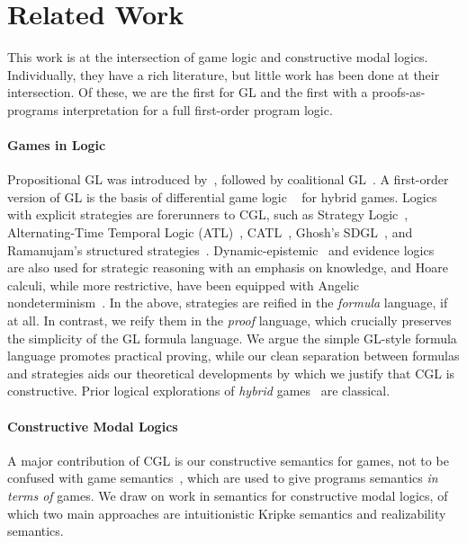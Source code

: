 \documentclass[12pt]{cmuthesis}
\theoremstyle{definition}
\theoremstyle{remark}
\newcommand{\CGL}{\textsf{CGL}\xspace}
\newcommand{\GL}{GL\xspace}
\begin{document}

\section{Related Work}
\newcommand{\semiset}[2]{\{#1~|~#2\}} 
This work is at the intersection of game logic and constructive modal logics.
Individually, they have a rich literature, but little work has been done at their intersection.
Of these, we are the first for \GL and the first with a proofs-as-programs interpretation for a full first-order program logic.

\paragraph{Games in Logic} 
Propositional \GL was introduced by~\cite{DBLP:conf/focs/Parikh83}, followed by coalitional \GL~\cite{DBLP:journals/logcom/Pauly02}.
A first-order version of \GL is the basis of differential game logic \dGL~\cite{DBLP:journals/tocl/Platzer15} for hybrid games.
Logics with explicit strategies are forerunners to \CGL, such as Strategy Logic~\cite{DBLP:conf/concur/ChatterjeeHP07}, Alternating-Time Temporal Logic (ATL)~\cite{DBLP:journals/jacm/AlurHK02}, CATL~\cite{DBLP:conf/atal/HoekJW05}, Ghosh's SDGL~\cite{ghosh2008strategies}, and Ramanujam's structured strategies~\cite{DBLP:conf/kr/RamanujamS08}.
Dynamic-epistemic~\cite{DBLP:series/lncs/Benthem15,DBLP:journals/games/BenthemPR11,van2001games} and evidence logics~\cite{DBLP:journals/sLogica/BenthemP11} are also used for strategic reasoning with an emphasis on knowledge, and Hoare calculi, while more restrictive, have been equipped with Angelic nondeterminism~\cite{DBLP:journals/corr/Mamouras16}.
In the above, strategies are reified in the \emph{formula} language, if at all.
In contrast, we reify them in the \emph{proof} language, which crucially preserves the simplicity of the \GL formula language.
We argue the simple \GL-style formula language promotes practical proving, while our clean separation between formulas and strategies aids our theoretical developments by which we justify that \CGL is constructive.
Prior logical explorations of \emph{hybrid} games~\cite{DBLP:conf/cade/QueselP12,DBLP:journals/tocl/Platzer15,DBLP:journals/tocl/Platzer17,DBLP:conf/cade/Platzer18} are classical.

\paragraph{Constructive Modal Logics}
A major contribution of \CGL is our constructive semantics for games, not to be confused with game semantics~\cite{DBLP:journals/iandc/AbramskyJM00}, which are used to give programs semantics \emph{in terms of} games.
We draw on work in semantics for constructive modal logics, of which two main approaches are intuitionistic Kripke semantics and realizability semantics.
\end{document}
